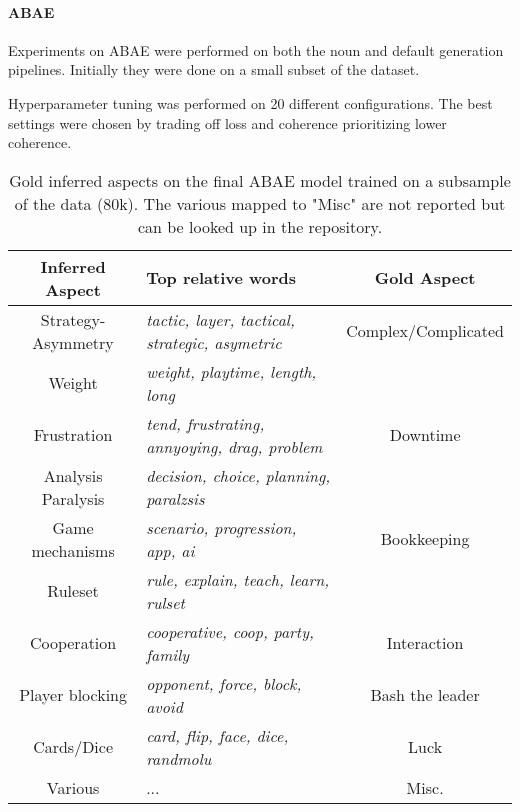 \paragraph{ABAE}
Experiments on ABAE were performed on both the noun and default generation pipelines.
Initially they were done on a small subset of the dataset.

Hyperparameter tuning was performed on 20 different configurations.
The best settings were chosen by trading off loss and coherence prioritizing lower coherence.

\begin{center}
    \begin{table}
        \begin{tabular}{c l c}
            \hline
            Inferred Aspect    & Top relative words                                     & Gold Aspect \\ [0.5ex]
            \hline\hline
            Strategy-Asymmetry & \textit{tactic, layer, tactical, strategic, asymetric} & Complex/Complicated \\
            Weight             & \textit{weight, playtime, length, long}                &                     \\
            \hline
            Frustration        & \textit{tend, frustrating, annyoying, drag, problem}   & Downtime            \\
            Analysis Paralysis & \textit{decision, choice, planning, paralzsis}         &                     \\
            \hline
            Game mechanisms    & \textit{scenario, progression, app, ai}                & Bookkeeping         \\
            Ruleset            & \textit{rule, explain, teach, learn, rulset}           &                     \\
            \hline
            Cooperation        & \textit{cooperative, coop, party, family}              & Interaction         \\
            \hline
            Player blocking    & \textit{opponent, force, block, avoid}                 & Bash the leader     \\
            \hline
            Cards/Dice         & \textit{card, flip, face, dice, randmolu}              & Luck                \\
            \hline
            Various            & ...                                                    & Misc.               \\
            \hline
        \end{tabular}
        \caption{Gold inferred aspects on the final ABAE model trained on a subsample of the data (80k).
        The various mapped to "Misc" are not reported but can be looked up in the repository.
        }
        \label{best-80}
    \end{table}

\end{center}


